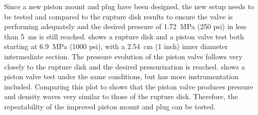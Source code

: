 Since a new piston mount and plug have been designed, the new setup needs to be tested and compared to the rupture disk results to ensure the valve is performing adequately and the desired pressure of \SI{1.72}{\mega\pascal} (250 psi) in less than \SI{5}{\milli\second} is still reached.  shows a rupture disk and a piston valve test both starting at \SI{6.9}{\mega\pascal} (1000 psi), with a \SI{2.54}{\centi\meter} (1 inch) inner diameter intermediate section. The pressure evolution of the piston valve follows very closely to the rupture disk and the desired pressurization is reached.  shows a piston valve test under the same conditions, but has more instrumentation included. Comparing this plot to  shows that the piston valve produces pressure and density waves very similar to those of the rupture disk. Therefore, the repeatability of the improved piston mount and plug can be tested. 






